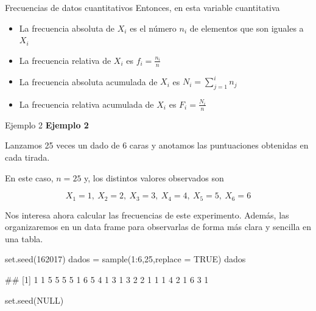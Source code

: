 \documentclass[
  ignorenonframetext,
  aspectratio=169]{beamer}
\newenvironment{Shaded}{\begin{snugshade}}{\end{snugshade}}
\newcommand{\AttributeTok}[1]{\textcolor[rgb]{0.77,0.63,0.00}{#1}}
\newcommand{\ConstantTok}[1]{\textcolor[rgb]{0.00,0.00,0.00}{#1}}
\newcommand{\DecValTok}[1]{\textcolor[rgb]{0.00,0.00,0.81}{#1}}
\newcommand{\FunctionTok}[1]{\textcolor[rgb]{0.00,0.00,0.00}{#1}}
\newcommand{\NormalTok}[1]{#1}
\newcommand{\OtherTok}[1]{\textcolor[rgb]{0.56,0.35,0.01}{#1}}
\newcommand{\SpecialCharTok}[1]{\textcolor[rgb]{0.00,0.00,0.00}{#1}}
\providecommand{\tightlist}{%
  \setlength{\itemsep}{0pt}\setlength{\parskip}{0pt}}
\let\oldverbatim\verbatim
\let\endoldverbatim\endverbatim
\renewenvironment{verbatim}{\tiny\oldverbatim}{\endoldverbatim}
\begin{document}
\begin{frame}{Frecuencias de datos cuantitativos}
\protect\hypertarget{frecuencias-de-datos-cuantitativos-2}{}
Entonces, en esta variable cuantitativa

\begin{itemize}
\tightlist
\item
  La frecuencia absoluta de \(X_i\) es el número \(n_i\) de elementos
  que son iguales a \(X_i\)
\item
  La frecuencia relativa de \(X_i\) es \(f_i=\frac{n_i}{n}\)
\item
  La frecuencia absoluta acumulada de \(X_i\) es \(N_i=\sum_{j=1}^in_j\)
\item
  La frecuencia relativa acumulada de \(X_i\) es \(F_i=\frac{N_i}{n}\)
\end{itemize}
\end{frame}

\begin{frame}[fragile]{Ejemplo 2}
\protect\hypertarget{ejemplo-2-2}{}
\textbf{Ejemplo 2}

Lanzamos 25 veces un dado de 6 caras y anotamos las puntuaciones
obtenidas en cada tirada.

En este caso, \(n=25\) y, los distintos valores observados son

\[X_1 = 1,\ X_2 = 2,\ X_3 = 3,\ X_4 = 4,\ X_5 = 5,\ X_6 = 6\]

Nos interesa ahora calcular las frecuencias de este experimento. Además,
las organizaremos en un data frame para observarlas de forma más clara y
sencilla en una tabla.

\begin{Shaded}
\begin{Highlighting}[]
\FunctionTok{set.seed}\NormalTok{(}\DecValTok{162017}\NormalTok{)}
\NormalTok{dados }\OtherTok{=} \FunctionTok{sample}\NormalTok{(}\DecValTok{1}\SpecialCharTok{:}\DecValTok{6}\NormalTok{,}\DecValTok{25}\NormalTok{,}\AttributeTok{replace =} \ConstantTok{TRUE}\NormalTok{)}
\NormalTok{dados}
\end{Highlighting}
\end{Shaded}

\begin{verbatim}
##  [1] 1 1 5 5 5 5 1 6 5 4 1 3 1 3 2 2 1 1 1 4 2 1 6 3 1
\end{verbatim}

\begin{Shaded}
\begin{Highlighting}[]
\FunctionTok{set.seed}\NormalTok{(}\ConstantTok{NULL}\NormalTok{)}
\end{Highlighting}
\end{Shaded}
\end{frame}
\end{document}
